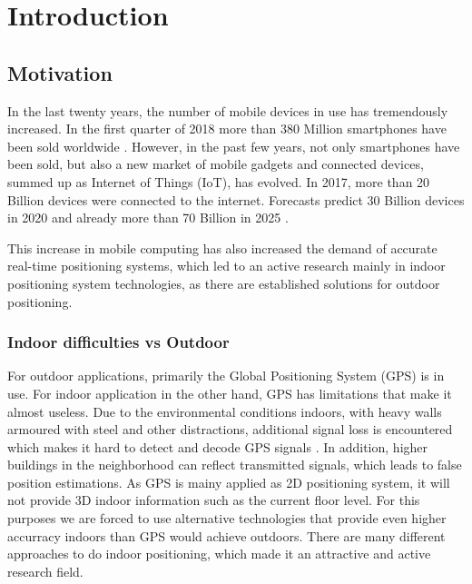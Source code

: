 
\chapter{Introduction} %

\label{Chapter1} %


\section{Motivation}
In the last twenty years, the number of mobile devices in use has tremendously increased. In the first quarter of 2018 more than 380 Million smartphones have been sold worldwide \cite{Gartner}. However, in the past few years, not only smartphones have been sold, but also a new market of mobile gadgets and connected devices, summed up as Internet of Things (IoT), has evolved. In 2017, more than 20 Billion devices were connected to the internet. Forecasts predict 30 Billion devices in 2020 and already more than 70 Billion in 2025 \cite{Statista}.

This increase in mobile computing has also increased the demand of accurate real-time positioning systems, which led to an active research mainly in indoor positioning system technologies, as there are established solutions for outdoor positioning. 

\subsection{Indoor difficulties vs Outdoor}

For outdoor applications, primarily the Global Positioning System (GPS) is in use. For indoor application in the other hand, GPS has limitations that make it almost useless. Due to the environmental conditions indoors, with heavy walls armoured with steel and other distractions, additional signal loss is encountered which makes it hard to detect and decode GPS signals \cite{GPSforIndoor}. In addition, higher buildings in the neighborhood can reflect transmitted signals, which leads to false position estimations. As GPS is mainy applied as 2D positioning system, it will not provide 3D indoor information such as the current floor level.
For this purposes we are forced to use alternative technologies that provide even higher accurracy indoors than GPS would achieve outdoors. There are many different approaches to do indoor positioning, which made it an attractive and active research field. 

